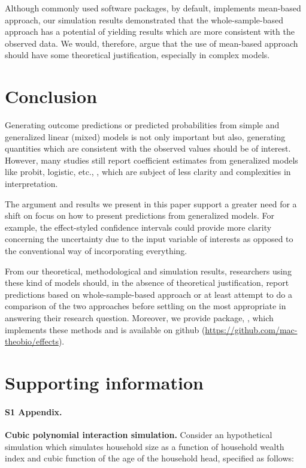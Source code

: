 Although commonly used  software packages, by default, implements mean-based approach, our simulation results demonstrated that the whole-sample-based approach has a potential of yielding results which are more consistent with the observed data. We would, therefore, argue that the use of mean-based approach should have some theoretical justification, especially in complex models. 

\section{Conclusion}

Generating outcome predictions or predicted probabilities from simple and generalized linear (mixed) models is not only important but also, generating quantities which are consistent with the observed values should be of interest. However, many studies still report coefficient estimates from generalized models like probit, logistic, etc., \citep{hanmer2013behind}, which are subject of less clarity and complexities in interpretation.

The argument and results we present in this paper support a greater need for a shift on focus on how to present predictions from generalized models. For example, the effect-styled confidence intervals could provide more clarity concerning the uncertainty due to the input variable of interests as opposed to the conventional way of incorporating everything. 

From our theoretical, methodological and simulation results, researchers using these kind of models should, in the absence of theoretical justification, report predictions based on whole-sample-based approach or at least attempt to do a comparison of the two approaches before settling on the most appropriate in answering their research question. Moreover, we provide  package, , which implements these methods and is available on github (\href{https://github.com/mac-theobio/effects}{https://github.com/mac-theobio/effects}).


\section{Supporting information}

\paragraph*{S1 Appendix.}
\label{S1_Appendix}
{\bf Cubic polynomial interaction simulation.} Consider an hypothetical simulation which simulates household size as a function of household wealth index and cubic function of the age of the household head, specified as follows:

